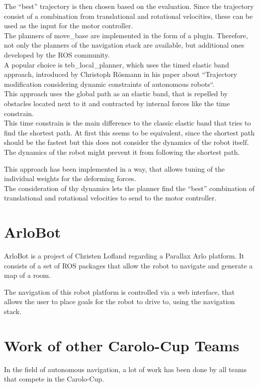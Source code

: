 The ``best'' trajectory is then chosen based on the evaluation. Since the trajectory consist of a combination from translational and rotational velocities, these can be used as the input for the motor controller\cite{dwaplanner}.\\

The planners of move\_base are implemented in the form of a plugin. Therefore, not only the planners of the navigation stack are available, but additional ones developed by the ROS community.\\

A popular choice is teb\_local\_planner, which uses the timed elastic band approach, introduced by Christoph Rösmann in his paper about ``Trajectory modification considering dynamic constraints of autonomous robots``.\\
This approach uses the global path as an elastic band, that is repelled by obstacles located next to it and contracted by internal forces like the time constrain.\\
This time constrain is the main difference to the classic elastic band that tries to find the shortest path. At first this seems to be equivalent, since the shortest path should be the fastest but this does not consider the dynamics of the robot itself. 
The dynamics of the robot might prevent it from following the shortest path\cite{Rsmann2012TrajectoryMC}. 

This approach has been implemented in a way, that allows tuning of the individual weights for the deforming forces.\\

The consideration of thy dynamics lets the planner find the ``best'' combination of translational and rotational velocities to send to the motor controller.


\section{ArloBot}
ArloBot is a project of Christen Lofland regarding a Parallax Arlo platform. It consists of a set of ROS packages that allow the robot to navigate and generate a map of a room\cite{chrisl8}.

The navigation of this robot platform is controlled via a web interface, that allows the user to place goals for the robot to drive to, using the navigation stack.

\section{Work of other Carolo-Cup Teams}
In the field of autonomous navigation, a lot of work has been done by all teams that compete in the Carolo-Cup.\\

